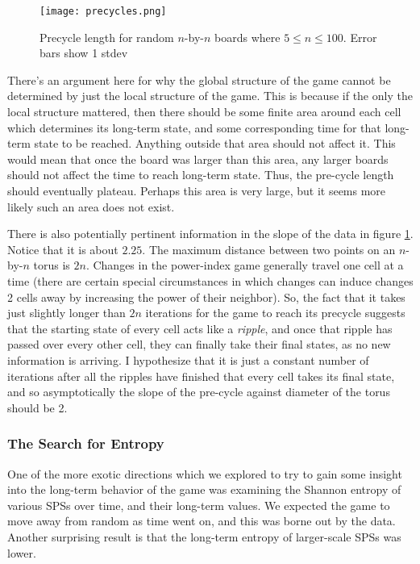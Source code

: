 \documentclass[12pt]{article}
\theoremstyle{definition}
\theoremstyle{remark}
\theoremstyle{remark}
\begin{document}
\begin{figure}
  \centering
  \label{Precycle}
  \texttt{[image: precycles.png]}
  \caption{Precycle length for random $n$-by-$n$ boards where $5\leq n \leq 100$. Error bars show 1 stdev}
\end{figure} %

\par
There's an argument here for why the global structure of the game cannot be determined by just the local structure of the game. This is because if the only the local structure mattered, then there should be some finite area around each cell which determines its long-term state, and some corresponding time for that long-term state to be reached. Anything outside that area should not affect it. This would mean that once the board was larger than this area, any larger boards should not affect the time to reach long-term state. Thus, the pre-cycle length should eventually plateau. Perhaps this area is very large, but it seems more likely such an area does not exist.

\par
There is also potentially pertinent information in the slope of the data in figure \ref{Precycle}. Notice that it is about $2.25$. The maximum distance between two points on an $n$-by-$n$ torus is $2n$. Changes in the power-index game generally travel one cell at a time (there are certain special circumstances in which changes can induce changes 2 cells away by increasing the power of their neighbor). So, the fact that it takes just slightly longer than $2n$ iterations for the game to reach its precycle suggests that the starting state of every cell acts like a \emph{ripple}, and once that ripple has passed over every other cell, they can finally take their final states, as no new information is arriving. I hypothesize that it is just a constant number of iterations after all the ripples have finished that every cell takes its final state, and so asymptotically the slope of the pre-cycle against diameter of the torus should be 2.


\subsubsection{The Search for Entropy}
\par
One of the more exotic directions which we explored to try to gain some insight into the long-term behavior of the game was examining the Shannon entropy of various SPSs over time, and their long-term values. We expected the game to move away from random as time went on, and this was borne out by the data. Another surprising result is that the long-term entropy of larger-scale SPSs was lower. %
\end{document}
